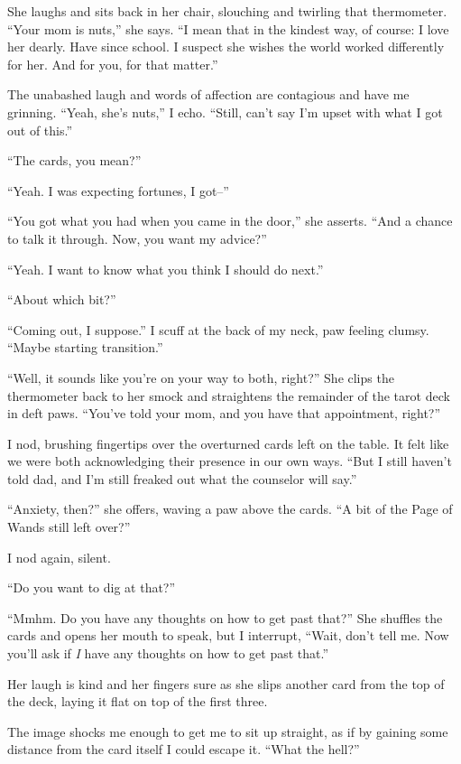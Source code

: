 She laughs and sits back in her chair, slouching and twirling that thermometer. ``Your mom is nuts,'' she says. ``I mean that in the kindest way, of course: I love her dearly. Have since school. I suspect she wishes the world worked differently for her. And for you, for that matter.''

The unabashed laugh and words of affection are contagious and have me grinning. ``Yeah, she's nuts,'' I echo. ``Still, can't say I'm upset with what I got out of this.''

``The cards, you mean?''

``Yeah. I was expecting fortunes, I got--''

``You got what you had when you came in the door,'' she asserts. ``And a chance to talk it through. Now, you want my advice?''

``Yeah. I want to know what you think I should do next.''

``About which bit?''

``Coming out, I suppose.'' I scuff at the back of my neck, paw feeling clumsy. ``Maybe starting transition.''

``Well, it sounds like you're on your way to both, right?'' She clips the thermometer back to her smock and straightens the remainder of the tarot deck in deft paws. ``You've told your mom, and you have that appointment, right?''

I nod, brushing fingertips over the overturned cards left on the table. It felt like we were both acknowledging their presence in our own ways. ``But I still haven't told dad, and I'm still freaked out what the counselor will say.''

``Anxiety, then?'' she offers, waving a paw above the cards. ``A bit of the Page of Wands still left over?''

I nod again, silent.

``Do you want to dig at that?''

``Mmhm. Do you have any thoughts on how to get past that?'' She shuffles the cards and opens her mouth to speak, but I interrupt, ``Wait, don't tell me. Now you'll ask if \emph{I} have any thoughts on how to get past that.''

Her laugh is kind and her fingers sure as she slips another card from the top of the deck, laying it flat on top of the first three.

The image shocks me enough to get me to sit up straight, as if by gaining some distance from the card itself I could escape it. ``What the hell?''

